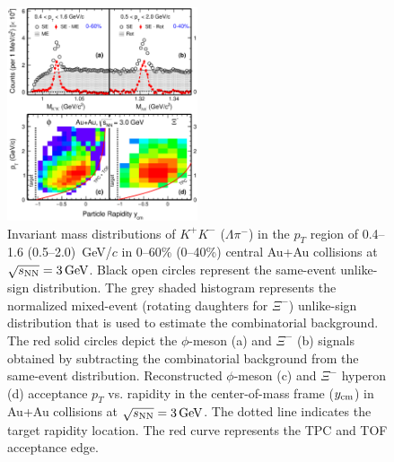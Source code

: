 \documentclass[%
 reprint,	
showpacs,
 amsmath,amssymb,
 aps,
 prc,
]{revtex4-1}
\begin{document}
\begin{figure}
\centering
\hspace*{-4mm}
\includegraphics[width=0.50\textwidth]{fig/fig1_signal.eps}
  \caption{Invariant mass distributions of $K^+K^-$ ($\Lambda\pi^-$) in the $p_T$ region of 0.4--1.6 (0.5--2.0) \,GeV/$c$ in 0--60\% (0--40\%) central Au+Au collisions at ${\sqrt{s_{\rm NN}} = \rm{3\,GeV}}$. Black open circles represent the same-event unlike-sign distribution. The grey shaded histogram represents the normalized mixed-event (rotating daughters for $\Xi^-$) unlike-sign distribution that is used to estimate the combinatorial background. The red solid circles depict the $\phi$-meson (a) and $\Xi^-$ (b) signals obtained by subtracting the combinatorial background from the same-event distribution. Reconstructed $\phi$-meson (c) and $\Xi^-$ hyperon (d) acceptance $p_T$ vs. rapidity in the center-of-mass frame ($y_{\rm cm}$) in Au+Au collisions at ${\sqrt{s_{\rm NN}} = \rm{3\,GeV}}$. The dotted line indicates the target rapidity location. The red curve represents the TPC and TOF acceptance edge.}
\label{fig:phiSignal} 
\end{figure}
\end{document}
